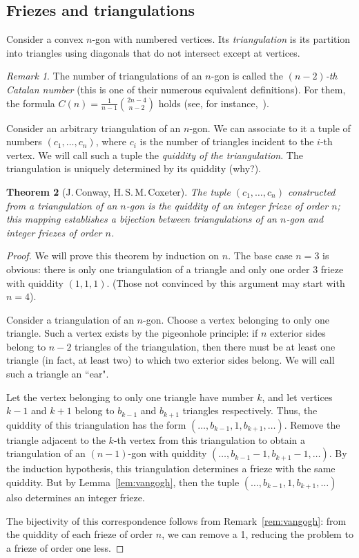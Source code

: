 \documentclass[a4paper,11pt]{amsart}
\theoremstyle{plain}
\newtheorem{theorem}{Theorem}[section]
\theoremstyle{remark}
\newtheorem{remark}[theorem]{Remark}
\theoremstyle{definition}
\numberwithin{equation}{section}
\numberwithin{figure}{section}
\begin{document}
\subsection{Friezes and triangulations}

Consider a convex $n$-gon with numbered vertices. Its \emph{triangulation} is its partition into triangles using diagonals that do not intersect except at vertices.

\begin{remark} The number of triangulations of an $n$-gon is called the \emph{$(n-2)$-th Catalan number} (this is one of their numerous equivalent definitions). For them, the formula $C(n) = \frac{1}{n-1}\binom{2n-4}{n-2}$ holds (see, for instance,~\cite{Stanley15}).
\end{remark}

Consider an arbitrary triangulation of an $n$-gon. We can associate to it a tuple of numbers $(c_1,\dots,c_n)$, where $c_i$ is the number of triangles incident to the $i$-th vertex. We will call such a tuple the \emph{quiddity of the triangulation}. The triangulation is uniquely determined by its quiddity (why?).

\begin{theorem}[J.\,Conway, H.\,S.\,M.\,Coxeter]\label{thm:cc}
The tuple $(c_1,\dots,c_n)$ constructed from a triangulation of an $n$-gon is the quiddity of an integer frieze of order $n$; this mapping establishes a bijection between triangulations of an $n$-gon and integer friezes of order $n$.
\end{theorem}

\begin{proof}
We will prove this theorem by induction on $n$. The base case $n=3$ is obvious: there is only one triangulation of a triangle and only one order $3$ frieze with quiddity $(1,1,1)$. (Those not convinced by this argument may start with $n=4$).

Consider a triangulation of an $n$-gon. Choose a vertex belonging to only one triangle. Such a vertex exists by the pigeonhole principle: if $n$ exterior sides belong to $n-2$ triangles of the triangulation, then there must be at least one triangle (in fact, at least two) to which two exterior sides belong. We will call such a triangle an ``ear".

Let the vertex belonging to only one triangle have number $k$, and let vertices $k-1$ and $k+1$ belong to $b_{k-1}$ and $b_{k+1}$ triangles respectively. Thus, the quiddity of this triangulation has the form $(\dots,b_{k-1},1,b_{k+1},\dots)$. Remove the triangle adjacent to the $k$-th vertex from this triangulation to obtain a triangulation of an $(n-1)$-gon with quiddity $(\dots,b_{k-1}-1,b_{k+1}-1,\dots)$. 
By the induction hypothesis, this triangulation determines a frieze with the same quiddity. But by Lemma~\ref{lem:vangogh}, then the tuple $(\dots,b_{k-1},1,b_{k+1},\dots)$ also determines an integer frieze.

The bijectivity of this correspondence follows from Remark~\ref{rem:vangogh}: from the quiddity of each  frieze of order $n$, we can remove a 1, reducing the problem to a frieze of order one less.
\end{proof}
\end{document}
